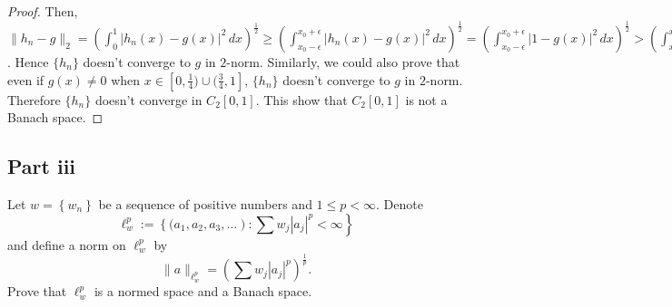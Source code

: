 \begin{answer}
\begin{proof}
        Then, $\lVert h_n - g \rVert_2 = (\int_0^1 \lvert h_n(x) - g(x) \rvert^2 \,dx)^{\frac{1}{2}} \geq (\int_{x_0-\epsilon}^{x_0+\epsilon} \lvert h_n(x) - g(x) \rvert^2 \,dx)^{\frac{1}{2}} = (\int_{x_0-\epsilon}^{x_0+\epsilon} \lvert 1 - g(x) \rvert^2 \,dx)^{\frac{1}{2}} > (\int_{x_0-\epsilon}^{x_0+\epsilon}\tfrac{\delta^2}{2}\,dx)^{\frac{1}{2}} = \delta\cdot\sqrt{\epsilon}$. Hence $\{h_n\}$ doesn't converge to $g$ in $2$-norm. Similarly, we could also prove that even if $g(x) \neq 0$ when $x \in [0,\tfrac{1}{4})\cup(\tfrac{3}{4},1]$, $\{h_n\}$ doesn't converge to $g$ in $2$-norm. Therefore $\{h_n\}$ doesn't converge in $C_2[0,1]$. This show that $C_2[0,1]$ is not a Banach space.
    \end{proof}
\end{answer}

\subsection{Part iii}

\begin{question}
    Let $w=\left\{w_n\right\}$ be a sequence of positive numbers and $1 \leq p<\infty$. Denote
    $$
    \left.\ell_w^p:=\left\{(a_1, a_2, a_3, \ldots\right): \sum w_j\left|a_j\right|^p<\infty\right\}
    $$
    and define a norm on $\ell_w^p$ by
    $$
    \|a\|_{\ell_w^p}=\left(\sum w_j\left|a_j\right|^p\right)^{\frac{1}{p}} .
    $$
    Prove that $\ell_w^p$ is a normed space and a Banach space.
\end{question}

